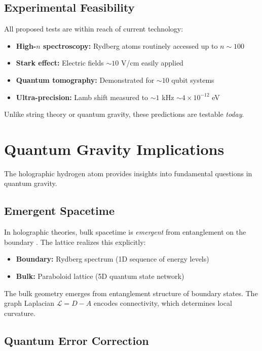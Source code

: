 \documentclass[aps,prd,twocolumn,superscriptaddress,floatfix]{revtex4-2}
\begin{document}
\subsection{Experimental Feasibility}

All proposed tests are within reach of current technology:
\begin{itemize}
\item \textbf{High-$n$ spectroscopy:} Rydberg atoms routinely accessed up to $n \sim 100$ \cite{gallagher1994}
\item \textbf{Stark effect:} Electric fields $\sim 10$ V/cm easily applied
\item \textbf{Quantum tomography:} Demonstrated for $\sim 10$ qubit systems \cite{nielsen2000}
\item \textbf{Ultra-precision:} Lamb shift measured to $\sim 1$ kHz $\sim 4 \times 10^{-12}$ eV \cite{parthey2011}
\end{itemize}

Unlike string theory or quantum gravity, these predictions are testable \textit{today}.


\section{Quantum Gravity Implications}

The holographic hydrogen atom provides insights into fundamental questions in quantum gravity.

\subsection{Emergent Spacetime}

In holographic theories, bulk spacetime is \textit{emergent} from entanglement on the boundary \cite{vanhove2010,swingle2012}. The lattice realizes this explicitly:
\begin{itemize}
\item \textbf{Boundary:} Rydberg spectrum (1D sequence of energy levels)
\item \textbf{Bulk:} Paraboloid lattice (5D quantum state network)
\end{itemize}

The bulk geometry emerges from entanglement structure of boundary states. The graph Laplacian $\mathcal{L} = D - A$ encodes connectivity, which determines local curvature.

\subsection{Quantum Error Correction}
\end{document}
